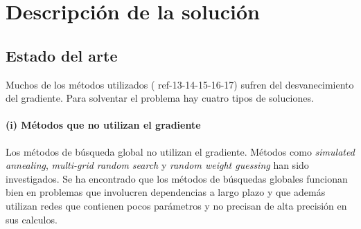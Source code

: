 \section{Descripción de la solución}
\begin{comment}
En la presente sección se describe el estado del arte y las características de la solución. Se explicara cual es el propósito de la solución, y posteriormente los alcances y limitaciones establecidas.
\end{comment}

\subsection{Estado del arte}
Muchos de los métodos utilizados (\cite{Elman1990, Schmidhuber1992b, Pearlmutter1989, Pearlmutter1995} ref-13-14-15-16-17) sufren del desvanecimiento del gradiente. Para solventar el problema hay cuatro tipos de soluciones.






\paragraph{(i) Métodos que no utilizan el gradiente} Los métodos de búsqueda global no utilizan el gradiente. Métodos como {\em simulated annealing}, {\em multi-grid random search} \cite{Bengio1994} y {\em random weight guessing} \cite{Schmidhuber1996} han sido investigados. Se ha encontrado que los métodos de búsquedas globales funcionan bien en problemas que involucren dependencias a largo plazo y que además utilizan redes que contienen pocos parámetros y no precisan de alta precisión en sus calculos.

